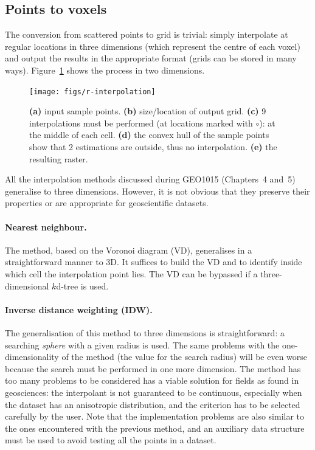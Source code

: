\subsection{Points to voxels}

The conversion from scattered points to grid is trivial: simply interpolate at regular locations in three dimensions%
(which represent the centre of each voxel) and output the results in the appropriate format (grids can be stored in many ways). 
Figure~\ref{fig:r-interpolation} shows the process in two dimensions.
\begin{figure}
  \centering
  \texttt{[image: figs/r-interpolation]}
  \caption{\textbf{(a)} input sample points. \textbf{(b)} size/location of output grid. \textbf{(c)} 9 interpolations must be performed (at locations marked with $\circ$): at the middle of each cell. \textbf{(d)} the convex hull of the sample points show that 2 estimations are outside, thus no interpolation. \textbf{(e)} the resulting raster.}%
\label{fig:r-interpolation}
\end{figure}

All the interpolation methods discussed during GEO1015 (Chapters~4 and~5) generalise to three dimensions.
However, it is not obvious that they preserve their properties or are appropriate for geoscientific datasets.

\paragraph{Nearest neighbour.} 
The method, based on the Voronoi diagram (VD),%
generalises in a straightforward manner to 3D.
It suffices to build the VD and to identify inside which cell the interpolation point lies.
The VD can be bypassed if a three-dimensional $k$d-tree is used.


\paragraph{Inverse distance weighting (\textbf{IDW}).}
The generalisation of this method to three dimensions is straightforward: a searching \emph{sphere} with a given radius is used. 
The same problems with the one-dimensionality of the method (the value for the search radius) will be even worse because the search must be performed in one more dimension. 
The method has too many problems to be considered  has a viable solution for fields as found in geosciences: the interpolant is not guaranteed to be continuous, especially when the dataset has an anisotropic distribution, 
and the criterion has to be selected carefully by the user.
Note that the implementation problems are also similar to the ones encountered with the previous method, and an auxiliary data structure must be used to avoid testing all the points in a dataset.


